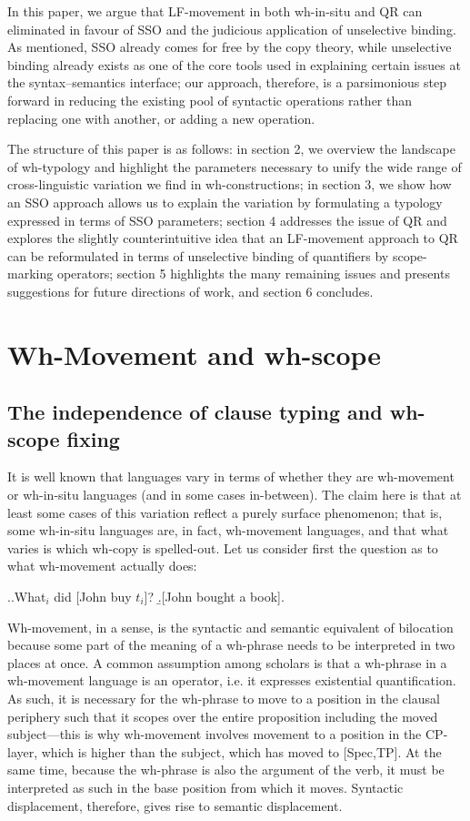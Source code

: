 \documentclass[11pt]{article}
\begin{document}
In this paper, we argue that LF-movement in both wh-in-situ and QR can eliminated in favour of SSO and the judicious application of unselective binding. As mentioned, SSO already comes for free by the copy theory, while unselective binding already exists as one of the core tools used in explaining certain issues at the syntax--semantics interface; our approach, therefore, is a parsimonious step forward in reducing the existing pool of syntactic operations rather than replacing one with another, or adding a new operation.

The structure of this paper is as follows: in section 2, we overview the landscape of wh-typology and highlight the parameters necessary to unify the wide range of cross-linguistic variation we find in wh-constructions; in section 3, we show how an SSO approach allows us to explain the variation by
formulating a typology expressed in terms of SSO parameters; section 4 addresses the issue of QR and explores the slightly counterintuitive idea that an LF-movement approach to QR can be reformulated in terms of unselective binding of quantifiers by scope-marking operators; section 5 highlights the many remaining issues and presents suggestions for future directions of work, and section 6 concludes.

\section{Wh-Movement and wh-scope}
\subsection{The independence of clause typing and wh-scope fixing}
It is well known that languages vary in terms of whether they are wh-movement or wh-in-situ languages (and in some cases in-between). The claim here is that at least some cases of this variation reflect a purely surface phenomenon; that is, some wh-in-situ languages are, in fact, wh-movement languages, and that what varies is which wh-copy is spelled-out. Let us consider first the question as to what wh-movement actually does:

\ex.\label{wh.10}\a.\label{2.10a}What$_i$ did [John buy $t_i$]?
	\b.\label{2.10b}[John bought a book].

Wh-movement, in a sense, is the syntactic and semantic equivalent of bilocation because some part of the meaning of a wh-phrase needs to be interpreted in two places at once. A common assumption among scholars is that a wh-phrase in a wh-movement language is an operator, i.e. it expresses existential quantification. As such, it is necessary for the wh-phrase to move to a position in the clausal periphery such that it scopes over the entire proposition including the moved subject---this is why wh-movement involves movement to a position in the CP-layer, which is higher than the subject, which has moved to [Spec,TP]. At the same time, because the wh-phrase is also the argument of the verb, it must be interpreted as such in the base position from which it moves. Syntactic displacement, therefore, gives rise to semantic displacement.
\end{document}
